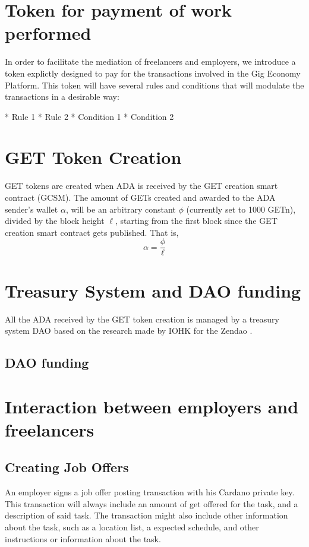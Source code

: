 \documentclass{article}
\begin{document}
\section{Token for payment of work performed}
In order to facilitate the mediation of freelancers and employers, we introduce a token explictly designed to pay for the transactions involved in the Gig Economy Platform. This token will have several rules and conditions that will modulate the transactions in a desirable way:

* Rule 1
* Rule 2
* Condition 1
* Condition 2

\section{GET Token Creation}
GET tokens are created when ADA is received by the GET creation smart contract (GCSM).
The amount of GETs created and awarded to the ADA sender's wallet $\alpha$, will be an arbitrary constant $\phi$ (currently set to 1000 GETn), divided by the block height $\ell$, starting from the first block since the GET creation smart contract gets published. That is,
\[ \alpha
  = \dfrac{\phi}{\ell}
\]

\section{Treasury System and DAO funding}
All the ADA received by the GET token creation is managed by a treasury system DAO based on the research made by IOHK for the Zendao \cite{zhangb2}.
 
\subsection{DAO funding}

\section{Interaction between employers and freelancers}

\subsection{Creating Job Offers}
An employer signs a job offer posting transaction with his Cardano private key. This transaction will always include an amount of get offered for the task, and a description of said task. The transaction might also include other information about the task, such as a location list, a expected schedule, and other instructions or information about the task.
\end{document}
